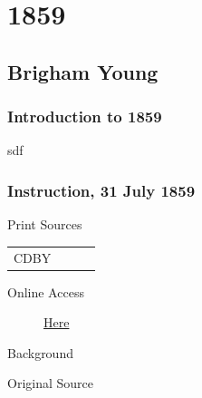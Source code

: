 \section{1859}

	\subsection{Brigham Young}
		\label{EMS-1859-BY}

		\subsubsection{Introduction to 1859}
		
			sdf
			
		\subsubsection{Instruction, 31 July 1859}
			\label{EMS-1854-BY-31-JUL-1859}
			
			\begin{description}
					\item[Print Sources]
				\end{description}

					\begin{tabular}{p{0.5in}p{1in}p{0.5in}p{1in}}
					CDBY	& 		&  		&  \\
					\end{tabular}
				
				\begin{description}
					\item[Online Access] \href{https://jod.mrm.org/7/201}{Here}
				\end{description}
				
				\begin{description}
					\item[Background]
				\end{description}
				
					\phantom{.}
				
				\begin{description}
					\item[Original Source]
				\end{description}
				
